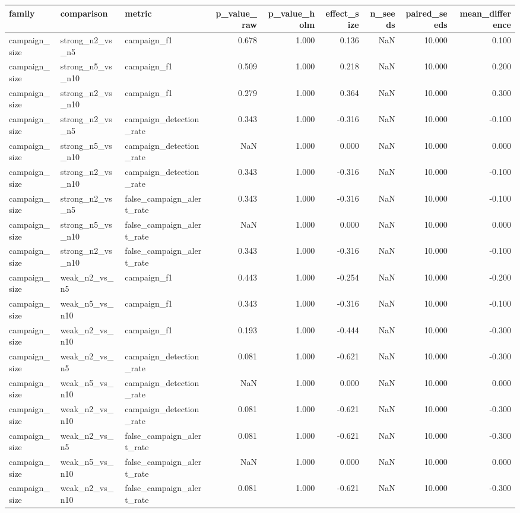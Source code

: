 \begin{tabular}{lllrrrrrr}
\toprule
family & comparison & metric & p_value_raw & p_value_holm & effect_size & n_seeds & paired_seeds & mean_difference \\
\midrule
campaign_size & strong_n2_vs_n5 & campaign_f1 & 0.678 & 1.000 & 0.136 & NaN & 10.000 & 0.100 \\
campaign_size & strong_n5_vs_n10 & campaign_f1 & 0.509 & 1.000 & 0.218 & NaN & 10.000 & 0.200 \\
campaign_size & strong_n2_vs_n10 & campaign_f1 & 0.279 & 1.000 & 0.364 & NaN & 10.000 & 0.300 \\
campaign_size & strong_n2_vs_n5 & campaign_detection_rate & 0.343 & 1.000 & -0.316 & NaN & 10.000 & -0.100 \\
campaign_size & strong_n5_vs_n10 & campaign_detection_rate & NaN & 1.000 & 0.000 & NaN & 10.000 & 0.000 \\
campaign_size & strong_n2_vs_n10 & campaign_detection_rate & 0.343 & 1.000 & -0.316 & NaN & 10.000 & -0.100 \\
campaign_size & strong_n2_vs_n5 & false_campaign_alert_rate & 0.343 & 1.000 & -0.316 & NaN & 10.000 & -0.100 \\
campaign_size & strong_n5_vs_n10 & false_campaign_alert_rate & NaN & 1.000 & 0.000 & NaN & 10.000 & 0.000 \\
campaign_size & strong_n2_vs_n10 & false_campaign_alert_rate & 0.343 & 1.000 & -0.316 & NaN & 10.000 & -0.100 \\
campaign_size & weak_n2_vs_n5 & campaign_f1 & 0.443 & 1.000 & -0.254 & NaN & 10.000 & -0.200 \\
campaign_size & weak_n5_vs_n10 & campaign_f1 & 0.343 & 1.000 & -0.316 & NaN & 10.000 & -0.100 \\
campaign_size & weak_n2_vs_n10 & campaign_f1 & 0.193 & 1.000 & -0.444 & NaN & 10.000 & -0.300 \\
campaign_size & weak_n2_vs_n5 & campaign_detection_rate & 0.081 & 1.000 & -0.621 & NaN & 10.000 & -0.300 \\
campaign_size & weak_n5_vs_n10 & campaign_detection_rate & NaN & 1.000 & 0.000 & NaN & 10.000 & 0.000 \\
campaign_size & weak_n2_vs_n10 & campaign_detection_rate & 0.081 & 1.000 & -0.621 & NaN & 10.000 & -0.300 \\
campaign_size & weak_n2_vs_n5 & false_campaign_alert_rate & 0.081 & 1.000 & -0.621 & NaN & 10.000 & -0.300 \\
campaign_size & weak_n5_vs_n10 & false_campaign_alert_rate & NaN & 1.000 & 0.000 & NaN & 10.000 & 0.000 \\
campaign_size & weak_n2_vs_n10 & false_campaign_alert_rate & 0.081 & 1.000 & -0.621 & NaN & 10.000 & -0.300 \\
\bottomrule
\end{tabular}
